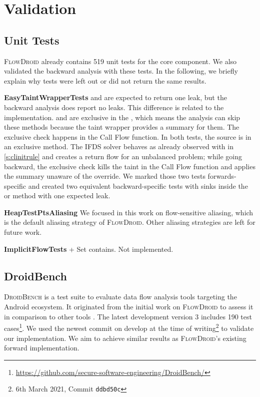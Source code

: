 \documentclass[../draft.tex]{subfiles}
\begin{document}
    \chapter{Validation}
    \section{Unit Tests}
    \textsc{FlowDroid} already contains 519 unit tests for the core component. We also validated the backward analysis with these tests. In the following, we briefly explain why tests were left out or did not return the same results.

    \textbf{EasyTaintWrapperTests}  and  are expected to return one leak, but the backward analysis does report no leaks. 
    This difference is related to the  implementation. 
     and  are exclusive in the , which means the analysis can skip these methods because the taint wrapper provides a summary for them. 
    The exclusive check happens in the Call Flow function. 
    In both tests, the source is in an exclusive method. 
    The IFDS solver behaves as already observed with  in \autoref{s:clinitrule} and creates a return flow for an unbalanced problem; while going backward, the exclusive check kills the taint in the Call Flow function and applies the summary unaware of the override.
    We marked those two tests forwards-specific and created two equivalent backward-specific tests with sinks inside the  or  method with one expected leak.

    \textbf{HeapTestPtsAliasing} We focused in this work on flow-sensitive aliasing, which is the default aliasing strategy of \textsc{FlowDroid}. Other aliasing strategies are left for future work. 
    
    \textbf{ImplicitFlowTests} + Set contains. Not implemented. 

    \section{DroidBench}\label{s:droidbenchvalidation}
    \textsc{DroidBench} is a test suite to evaluate data flow analysis tools targeting the Android ecosystem. It originated from the initial work on \textsc{FlowDroid} to assess it in comparison to other tools \cite{Arzt2014}. The latest development version 3 includes 190 test cases\footnote{\url{https://github.com/secure-software-engineering/DroidBench/}}. We used the newest commit on develop at the time of writing\footnote{6th March 2021, Commit \texttt{ddbd50c}} to validate our implementation.
    We aim to achieve similar results as \textsc{FlowDroid}'s existing forward implementation. 
    
\end{document}
